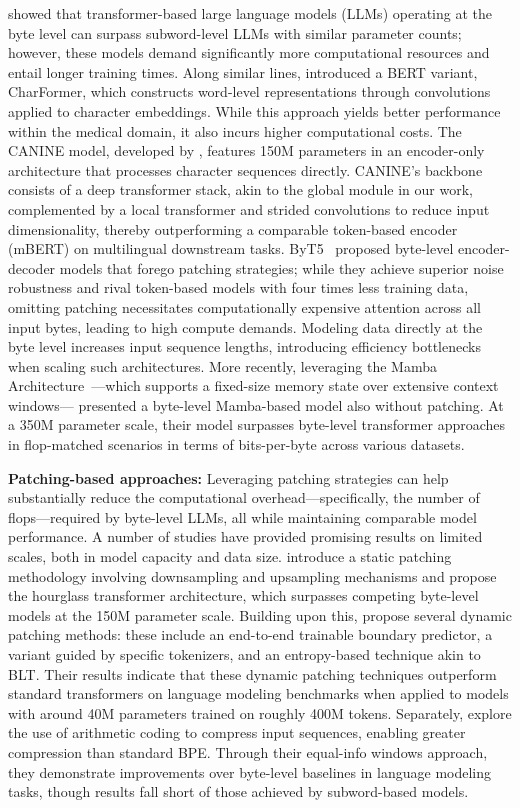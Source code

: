 \cite{Choe2019BridgingTG} showed that transformer-based large language models (LLMs) operating at the byte level can surpass subword-level LLMs with similar parameter counts; however, these models demand significantly more computational resources and entail longer training times. Along similar lines, \cite{el2020characterbert} introduced a BERT variant, CharFormer, which constructs word-level representations through convolutions applied to character embeddings. While this approach yields better performance within the medical domain, it also incurs higher computational costs. The CANINE model, developed by \cite{clark2022canine}, features 150M parameters in an encoder-only architecture that processes character sequences directly. CANINE’s backbone consists of a deep transformer stack, akin to the global module in our work, complemented by a local transformer and strided convolutions to reduce input dimensionality, thereby outperforming a comparable token-based encoder (mBERT) on multilingual downstream tasks. ByT5~\citep{xue2022byt5} proposed byte-level encoder-decoder models that forego patching strategies; while they achieve superior noise robustness and rival token-based models with four times less training data, omitting patching necessitates computationally expensive attention across all input bytes, leading to high compute demands. Modeling data directly at the byte level increases input sequence lengths, introducing efficiency bottlenecks when scaling such architectures. More recently, leveraging the Mamba Architecture~\citep{gu2023mamba}—which supports a fixed-size memory state over extensive context windows—\cite{wang2024mambabyte} presented a byte-level Mamba-based model also without patching. At a 350M parameter scale, their model surpasses byte-level transformer approaches in flop-matched scenarios in terms of bits-per-byte across various datasets.

\textbf{Patching-based approaches:} Leveraging patching strategies can help substantially reduce the computational overhead—specifically, the number of flops—required by byte-level LLMs, all while maintaining comparable model performance. A number of studies have provided promising results on limited scales, both in model capacity and data size. \cite{nawrot-etal-2022-hierarchical} introduce a static patching methodology involving downsampling and upsampling mechanisms and propose the hourglass transformer architecture, which surpasses competing byte-level models at the 150M parameter scale. Building upon this, \cite{nawrot-etal-2023-efficient} propose several dynamic patching methods: these include an end-to-end trainable boundary predictor, a variant guided by specific tokenizers, and an entropy-based technique akin to {\textsc BLT}. Their results indicate that these dynamic patching techniques outperform standard transformers on language modeling benchmarks when applied to models with around 40M parameters trained on roughly 400M tokens. Separately, \cite{lester2024training} explore the use of arithmetic coding to compress input sequences, enabling greater compression than standard BPE. Through their equal-info windows approach, they demonstrate improvements over byte-level baselines in language modeling tasks, though results fall short of those achieved by subword-based models.

